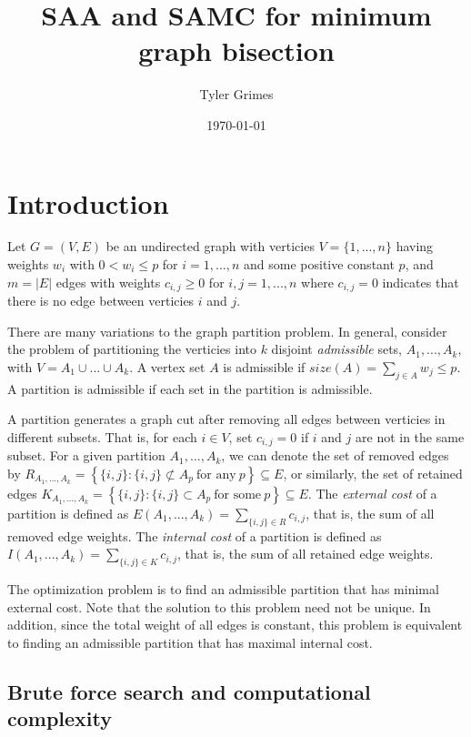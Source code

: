 \documentclass[11pt,]{article}
\title{\LARGE{SAA and SAMC for minimum graph bisection} \vspace{1pc}}
\author{\Large{Tyler Grimes} \vspace{1pc}}
\date{\today}
\begin{document}
\maketitle

\setlength{\parindent}{2em} \setlength{\parskip}{0em}

\section{Introduction}\label{introduction}

Let \(G = (V, E)\) be an undirected graph with verticies
\(V = \{1, ..., n\}\) having weights \(w_i\) with \(0<w_i\leq p\) for
\(i = 1,...,n\) and some positive constant \(p\), and \(m = |E|\) edges
with weights \(c_{i, j} \geq 0\) for \(i, j = 1, ...,n\) where
\(c_{i, j} = 0\) indicates that there is no edge between verticies \(i\)
and \(j\).

There are many variations to the graph partition problem. In general,
consider the problem of partitioning the verticies into \(k\) disjoint
\emph{admissible} sets, \(A_1, ..., A_k\), with
\(V = A_1 \cup ... \cup A_k\). A vertex set \(A\) is admissible if
\(size(A) = \sum_{j \in A}w_j \leq p\). A partition is admissible if
each set in the partition is admissible.

A partition generates a graph cut after removing all edges between
verticies in different subsets. That is, for each \(i \in V\), set
\(c_{i, j} = 0\) if \(i\) and \(j\) are not in the same subset. For a
given partition \(A_1, ..., A_k\), we can denote the set of removed
edges by
\(R_{A_1, ..., A_k} = \left\{\{i, j\}: \{i, j\} \not\subset A_p \ \text{for any} \ p\right\} \subseteq E\),
or similarly, the set of retained edges
\(K_{A_1, ..., A_k} = \left\{\{i, j\}: \{i, j\} \subset A_p \ \text{for some} \ p\right\} \subseteq E\).
The \emph{external cost} of a partition is defined as
\(E(A_1, ..., A_k) = \sum_{\{i, j\} \in R} c_{i, j}\), that is, the sum
of all removed edge weights. The \emph{internal cost} of a partition is
defined as \(I(A_1, ..., A_k) = \sum_{\{i, j\} \in K} c_{i, j}\), that
is, the sum of all retained edge weights.

The optimization problem is to find an admissible partition that has
minimal external cost. Note that the solution to this problem need not
be unique. In addition, since the total weight of all edges is constant,
this problem is equivalent to finding an admissible partition that has
maximal internal cost.

\subsection{Brute force search and computational
complexity}\label{brute-force-search-and-computational-complexity}
\end{document}
